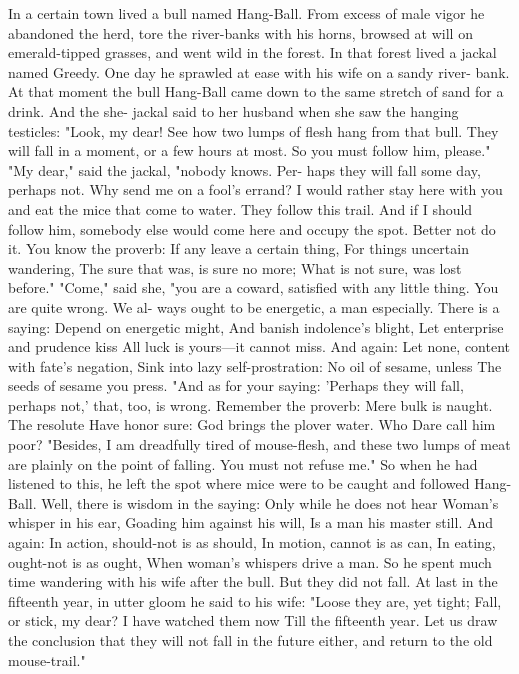 \documentclass{book}
\begin{document}
In a certain town lived a bull named Hang-Ball.
From excess of male vigor he abandoned the herd,
tore the river-banks with his horns, browsed at will
on emerald-tipped grasses, and went wild in the
forest.
In that forest lived a jackal named Greedy. One
day he sprawled at ease with his wife on a sandy river-
bank. At that moment the bull Hang-Ball came down
to the same stretch of sand for a drink. And the she-
jackal said to her husband when she saw the hanging
testicles: "Look, my dear! See how two lumps of
flesh hang from that bull. They will fall in a moment,
or a few hours at most. So you must follow him,
please."
"My dear," said the jackal, "nobody knows. Per-
haps they will fall some day, perhaps not. Why send
me on a fool's errand? I would rather stay here with
you and eat the mice that come to water. They follow
this trail. And if I should follow him, somebody else
would come here and occupy the spot. Better not
do it. You know the proverb:
If any leave a certain thing,
For things uncertain wandering,
The sure that was, is sure no more;
What is not sure, was lost before."
"Come," said she, "you are a coward, satisfied
with any little thing. You are quite wrong. We al-
ways ought to be energetic, a man especially. There
is a saying:
Depend on energetic might,
And banish indolence's blight,
Let enterprise and prudence kiss
All luck is yours---it cannot miss.
And again:
Let none, content with fate's negation,
Sink into lazy self-prostration:
No oil of sesame, unless
The seeds of sesame you press.
"And as for your saying: 'Perhaps they will fall,
perhaps not,' that, too, is wrong. Remember the
proverb:
Mere bulk is naught. The resolute
Have honor sure:
God brings the plover water. Who
Dare call him poor?
"Besides, I am dreadfully tired of mouse-flesh, and
these two lumps of meat are plainly on the point of
falling. You must not refuse me."
So when he had listened to this, he left the spot
where mice were to be caught and followed Hang-
Ball. Well, there is wisdom in the saying:
Only while he does not hear
Woman's whisper in his ear,
Goading him against his will,
Is a man his master still.
And again:
In action, should-not is as should,
In motion, cannot is as can,
In eating, ought-not is as ought,
When woman's whispers drive a man.
So he spent much time wandering with his wife
after the bull. But they did not fall. At last in the
fifteenth year, in utter gloom he said to his wife:
"Loose they are, yet tight;
Fall, or stick, my dear?
I have watched them now
Till the fifteenth year.
Let us draw the conclusion that they will not fall in
the future either, and return to the old mouse-trail."
\end{document}
